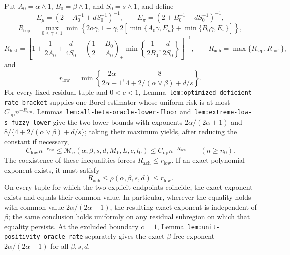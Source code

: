 Put \(A_0=\alpha\wedge1\), \(B_0=\beta\wedge1\), and \(S_0=s\wedge1\), and define
\[
E_\mu=\left(2+A_0^{-1}+dS_0^{-1}\right)^{-1},
\qquad
E_\pi=\left(2+B_0^{-1}+dS_0^{-1}\right)^{-1},
\]
\[
R_{\mathrm{sep}}
=
\max_{0\le\gamma\le1}
\min\left\{
2\alpha\gamma,
1-\gamma,
2\left[\min\{A_0\gamma,E_\mu\}+\min\{B_0\gamma,E_\pi\}\right]
\right\},
\]
\[
R_{\mathrm{hist}}
=
\left[
1+\frac1{2A_0}+\frac d{4S_0}
+\left(\frac12-\frac{B_0}{A_0}\right)_+
\min\left\{\frac1{2B_0},\frac d{2S_0}\right\}
\right]^{-1},
\qquad
R_{\mathrm{ach}}=\max\{R_{\mathrm{sep}},R_{\mathrm{hist}}\},
\]
and
\[
r_{\mathrm{low}}
=
\min\left\{
\frac{2\alpha}{2\alpha+1},
\frac{8}{4+2/(\alpha\vee\beta)+d/s}
\right\}.
\]
For every fixed residual tuple and \(0<c<1\), Lemma~\texttt{lem:optimized-deficient-rate-bracket} supplies one Borel estimator whose uniform risk is at most \(C_{\mathrm{up}}n^{-R_{\mathrm{ach}}}\). Lemmas~\texttt{lem:all-beta-oracle-lower-floor} and~\texttt{lem:extreme-low-s-fuzzy-lower} give the two lower bounds with exponents \(2\alpha/(2\alpha+1)\) and \(8/\{4+2/(\alpha\vee\beta)+d/s\}\); taking their maximum yields, after reducing the constant if necessary,
\[
C_{\mathrm{low}}n^{-r_{\mathrm{low}}}
\le
\mathcal M_n(\alpha,\beta,s,d,M_Y,L,c,t_0)
\le
C_{\mathrm{up}}n^{-R_{\mathrm{ach}}}
\qquad(n\ge n_0).
\]
The coexistence of these inequalities forces \(R_{\mathrm{ach}}\le r_{\mathrm{low}}\). If an exact polynomial exponent exists, it must satisfy
\[
R_{\mathrm{ach}}
\le
\rho(\alpha,\beta,s,d)
\le
r_{\mathrm{low}}.
\]
On every tuple for which the two explicit endpoints coincide, the exact exponent exists and equals their common value. In particular, wherever the equality holds with common value \(2\alpha/(2\alpha+1)\), the resulting exact exponent is independent of \(\beta\); the same conclusion holds uniformly on any residual subregion on which that equality persists. At the excluded boundary \(c=1\), Lemma~\texttt{lem:unit-positivity-oracle-rate} separately gives the exact \(\beta\)-free exponent \(2\alpha/(2\alpha+1)\) for all \(\beta,s,d\).